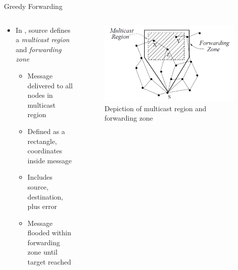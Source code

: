 \documentclass[pdftex]{beamer}
\begin{document}
\begin{frame}{Greedy Forwarding}
\begin{columns}
\begin{column}{.5\textwidth}
\begin{itemize}
	\item In \cite{749282}, source defines a \emph{multicast region} and \emph{forwarding zone}
		\begin{itemize}
			\item Message delivered to all nodes in multicast region
			\item Defined as a rectangle, coordinates inside message
			\item Includes source, destination, plus error
			\item Message flooded within forwarding zone until target reached
		\end{itemize}
\end{itemize}
\end{column}

\begin{column}{.5\textwidth}
\begin{figure}
\centering
\includegraphics[width=\textwidth]{geocast_region}
\caption{Depiction of multicast region and forwarding zone}
\end{figure}
\end{column}
\end{columns}
\end{frame}
\end{document}
